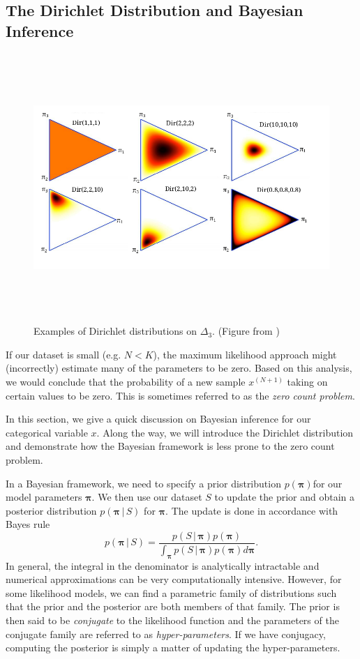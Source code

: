 \documentclass[final,3p,times,twocolumn]{elsarticle}
\let\bs\boldsymbol
\begin{document}
\subsection{The Dirichlet Distribution and Bayesian Inference}
\label{sect:dirdistro}
\begin{figure}
\includegraphics[width=\textwidth,height=4in]{dir.png}
\caption{Examples of Dirichlet distributions on $\Delta_3$. (Figure from \cite{ywt07})}
\label{fig:dir}
\end{figure}

If our dataset is small (e.g. $N < K$), the maximum likelihood approach might (incorrectly) estimate many of the parameters to be zero.
Based on this analysis, we would conclude that the probability of a new sample $x^{(N+1)}$ taking on certain values to be zero.
This is sometimes referred to as the \emph{zero count problem}.

In this section, we give a quick discussion on Bayesian inference for our categorical variable $x$. Along the way, we will introduce the Dirichlet distribution and demonstrate how the Bayesian framework is less prone to the zero count problem.

In a Bayesian framework, we need to specify a prior distribution $p(\bs \pi)$for our model parameters $\bs \pi$. We then use our dataset $S$ to update the prior and obtain a posterior distribution $p(\bs \pi\,|\,S)$ for $\bs \pi$.
The update is done in accordance with Bayes rule
\begin{equation}
\label{eqn:bayes}
p(\bs \pi \,|\, S) = \frac{p(S\,|\,\bs \pi) p(\bs \pi)}{\int_{\bs \pi} p(S\,|\,\bs \pi)p(\bs \pi)d\bs\pi}.
\end{equation}
In general, the integral in the denominator is analytically intractable and numerical approximations can be very computationally intensive.
However, for some likelihood models, we can find a parametric family of distributions such that the prior and the posterior are both members of that family. 
The prior is then said to be \emph{conjugate} to the likelihood function and the parameters of the conjugate family are referred to as \emph{hyper-parameters}.
If we have conjugacy, computing the posterior is simply a matter of updating the hyper-parameters.
\end{document}
